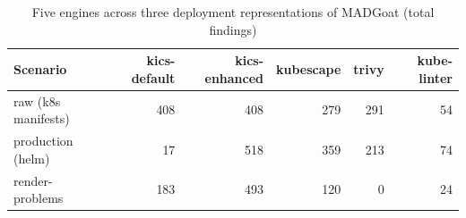 \begin{table}[htbp]\centering\small
\caption{Five engines across three deployment representations of MADGoat (total findings)}\label{tab:engine-scenarios}
\begin{tabular}{@{}lrrrrr@{}}\toprule
\textbf{Scenario} & \textbf{kics-default} & \textbf{kics-enhanced} & \textbf{kubescape} & \textbf{trivy} & \textbf{kube-linter} \\
\midrule
raw (k8s manifests) & 408 & 408 & 279 & 291 & 54 \\
production (helm) & 17 & 518 & 359 & 213 & 74 \\
render-problems & 183 & 493 & 120 & 0 & 24 \\
\bottomrule\end{tabular}\end{table}
